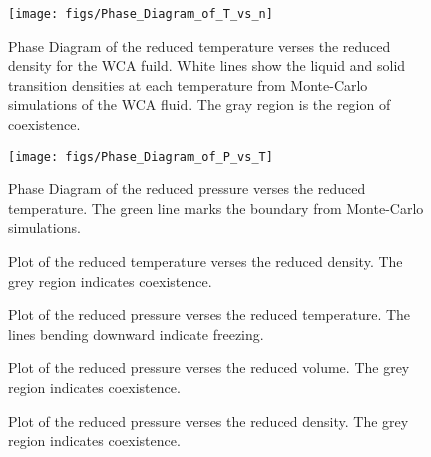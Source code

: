\documentclass[12pt]{article}
\begin{document}
\begin{figure}
  \centering
  \texttt{[image: figs/Phase\_Diagram\_of\_T\_vs\_n]}
  \caption{Phase Diagram of the reduced temperature verses the reduced density for the WCA fuild. 
  White lines show the liquid and solid transition densities at each temperature from 
  Monte-Carlo simulations of the WCA fluid. The gray region is the region of coexistence.}
  \label{fig:Phase_Diagram_of_T_vs_n}
\end{figure}

\begin{figure}
  \centering
  \texttt{[image: figs/Phase\_Diagram\_of\_P\_vs\_T]}
  \caption{Phase Diagram of the reduced pressure verses the reduced temperature. 
  The green line marks the boundary from Monte-Carlo simulations.}
  \label{fig:Phase_Diagram_P_vs_T}
\end{figure}


\begin{figure}
  \centering
  \caption{Plot of the reduced temperature verses the reduced density. 
  The grey region indicates coexistence.}
  \label{fig:T-vs-n_at_fixed_P}
\end{figure}

\begin{figure}
  \centering
  \caption{Plot of the reduced pressure verses the reduced temperature. 
  The lines bending downward indicate freezing.}
  \label{fig:p-vs-T_at_fixed_density}
\end{figure}

\begin{figure}
  \centering
  \caption{Plot of the reduced pressure verses the reduced volume. 
  The grey region indicates coexistence.}
  \label{fig:p-vs-V_at_fixed_T}
\end{figure}

\begin{figure}
  \centering
  \caption{Plot of the reduced pressure verses the reduced density. 
  The grey region indicates coexistence.}
  \label{fig:p-vs-n_at_fixed_T}
\end{figure}
\end{document}
